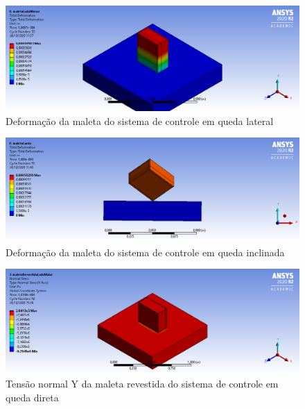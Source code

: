 \begin{apendicesenv}
\begin{figure}[htb]
    \centering
    \includegraphics[width=1.0\textwidth, angle=0]{figuras/estrutura_simulacaoImpacto/maletaDeformacaoMenor.png}
    \caption{Deformação da maleta do sistema de controle em queda lateral}
    \label{fig:simulacaoImpacto_26}
\end{figure}

\begin{figure}[htb]
    \centering
    \includegraphics[width=1.0\textwidth, angle=0]{figuras/estrutura_simulacaoImpacto/maletaDeformacaoCanto.png}
    \caption{Deformação da maleta do sistema de controle em queda inclinada}
    \label{fig:simulacaoImpacto_27}
\end{figure}

\begin{figure}[htb]
    \centering
    \includegraphics[width=1.0\textwidth, angle=0]{figuras/estrutura_simulacaoImpacto/maletaRevestidaNormalYMaior.png}
    \caption{Tensão normal Y da maleta revestida do sistema de controle em queda direta}
    \label{fig:simulacaoImpacto_28}
\end{figure}


\end{apendicesenv}
